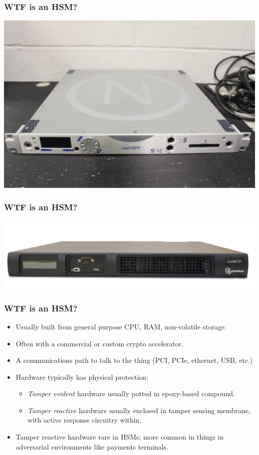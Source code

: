 \documentclass{beamer}
\begin{document}
\frame
{
  \frametitle{WTF is an HSM?}

  \includegraphics[width=1.0\textwidth]{imgs/nethsm.jpg}
}

\frame
{
  \frametitle{WTF is an HSM?}

  \includegraphics[width=1.0\textwidth]{imgs/luna-sa-sml.png}
}


\frame
{
  \frametitle{WTF is an HSM?}

  \begin{itemize}
  \item<1-> Usually built from general purpose CPU, RAM, non-volatile storage.
  \item<2-> Often with a commercial or custom crypto accelerator.
  \item<3-> A communications path to talk to the thing (PCI, PCIe, ethernet, USB, etc.)
  \item<4-> Hardware typically has physical protection:
    \begin{itemize}
    \item<5-> \emph{Tamper evident} hardware usually potted in epoxy-based compound.
    \item<6-> \emph{Tamper reactive} hardware usually enclosed in tamper sensing membrane, with active response circuitry within.
    \end{itemize}
  \item<7-> Tamper reactive hardware rare in HSMs; more common in things in adversarial environments like payments terminals.
  \end{itemize}
}
\end{document}
